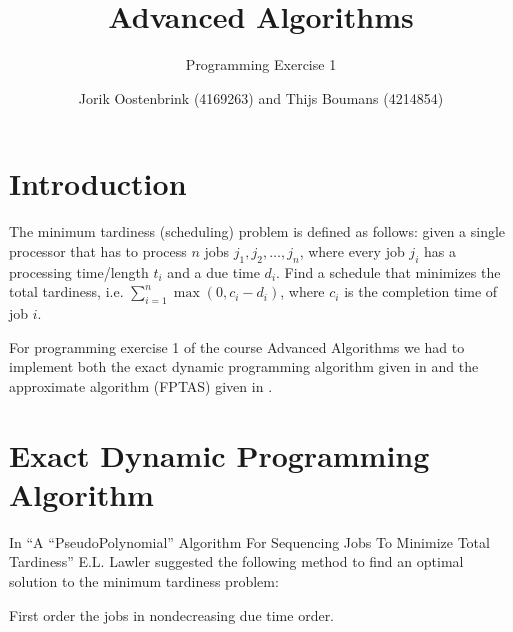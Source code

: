 \documentclass[a4paper,11pt]{article}
\title{Advanced Algorithms}
\subtitle{Programming Exercise 1}
\author{Jorik Oostenbrink (4169263) and Thijs Boumans (4214854)}
\date{}
\begin{document}
	
\maketitle

\section{Introduction}
The minimum tardiness (scheduling) problem is defined as follows: given a single processor that has to process $n$ jobs $j_1,j_2,\dots,j_n$, where every job $j_i$ has a processing time/length $t_i$ and a due time $d_i$. Find a schedule that minimizes the total tardiness, i.e. $\sum_{i=1}^{n}{\max(0,c_i - d_i)}$, where $c_i$ is the completion time of job $i$.

For programming exercise 1 of the course Advanced Algorithms we had to implement both the exact dynamic programming algorithm given in \cite{exact} and the approximate algorithm (FPTAS) given in \cite{approx}.

\section{Exact Dynamic Programming Algorithm}
In ``A ``PseudoPolynomial'' Algorithm For Sequencing Jobs To Minimize Total Tardiness'' \cite{exact} E.L. Lawler suggested the following method to find an optimal solution to the minimum tardiness problem:

First order the jobs in nondecreasing due time order.
	


\end{document}
